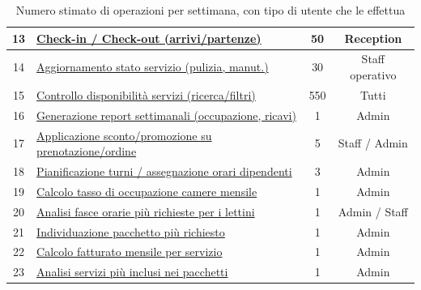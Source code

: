 \documentclass[a4paper,12pt]{report}
\begin{document}
\begin{table}[H]
\begin{tabularx}{\textwidth}{|c|>{\raggedright\arraybackslash}X|c|c|}
		\hline
		13          & \hyperref[op13]{Check-in / Check-out (arrivi/partenze)}                & 50                & Reception              \\
		\hline
		14          & \hyperref[op14]{Aggiornamento stato servizio (pulizia, manut.)}        & 30                & Staff operativo        \\
		\hline
		15          & \hyperref[op15]{Controllo disponibilità servizi (ricerca/filtri)}      & 550               & Tutti                  \\
		\hline
		16          & \hyperref[op16]{Generazione report settimanali (occupazione, ricavi)}  & 1                 & Admin                  \\
		\hline
		17          & \hyperref[op17]{Applicazione sconto/promozione su prenotazione/ordine} & 5                 & Staff / Admin          \\
		\hline
		18          & \hyperref[op18]{Pianificazione turni / assegnazione orari dipendenti}  & 3                 & Admin                  \\
		\hline
		19          & \hyperref[op19]{Calcolo tasso di occupazione camere mensile}           & 1                 & Admin                  \\
		\hline
		20          & \hyperref[op20]{Analisi fasce orarie più richieste per i lettini}      & 1                 & Admin / Staff          \\
		\hline
		21          & \hyperref[op21]{Individuazione pacchetto più richiesto}                & 1                 & Admin                  \\
		\hline
		22          & \hyperref[op22]{Calcolo fatturato mensile per servizio}                & 1                 & Admin                  \\
		\hline
		23          & \hyperref[op23]{Analisi servizi più inclusi nei pacchetti}             & 1                 & Admin                  \\
		\hline
	\end{tabularx}
	\caption{Numero stimato di operazioni per settimana, con tipo di utente che le effettua}
	\label{tab:operazioni-settimanali}
\end{table}

\newpage
\end{document}
